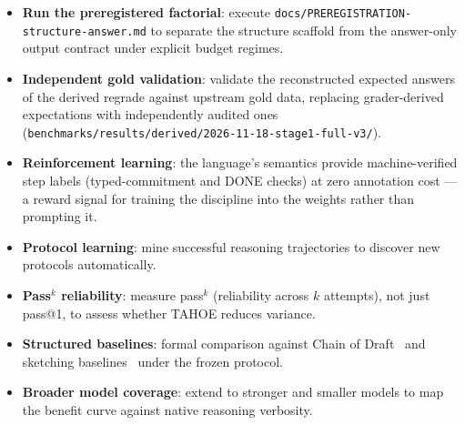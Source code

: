 \documentclass[11pt,a4paper]{article}
\begin{document}
\begin{itemize}[nosep,leftmargin=*]
    \item \textbf{Run the preregistered factorial}: execute \texttt{docs/PREREGISTRATION-structure-answer.md} to separate the structure scaffold from the answer-only output contract under explicit budget regimes.
    \item \textbf{Independent gold validation}: validate the reconstructed expected answers of the derived regrade against upstream gold data, replacing grader-derived expectations with independently audited ones (\texttt{benchmarks/results/derived/2026-11-18-stage1-full-v3/}).
    \item \textbf{Reinforcement learning}: the language's semantics provide machine-verified step labels (typed-commitment and DONE checks) at zero annotation cost --- a reward signal for training the discipline into the weights rather than prompting it.
    \item \textbf{Protocol learning}: mine successful reasoning trajectories to discover new protocols automatically.
    \item \textbf{Pass$^k$ reliability}: measure pass$^k$ (reliability across $k$ attempts), not just pass@1, to assess whether TAHOE reduces variance.
    \item \textbf{Structured baselines}: formal comparison against Chain of Draft~\cite{xu2025cod} and sketching baselines~\cite{lee2025sketch} under the frozen protocol.
    \item \textbf{Broader model coverage}: extend to stronger and smaller models to map the benefit curve against native reasoning verbosity.
\end{itemize}



\end{document}
